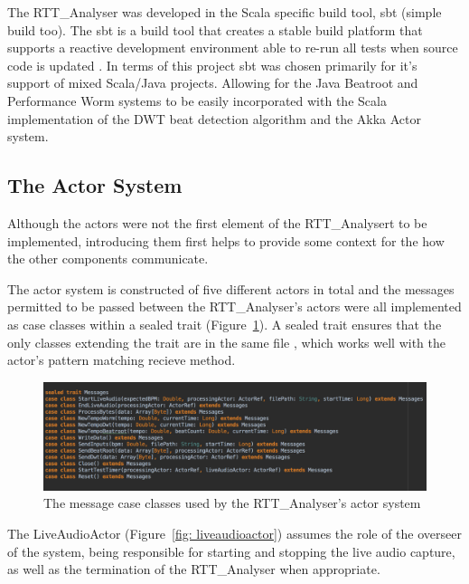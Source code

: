 \documentclass[a4paper, 11pt]{article}
\begin{document}
The RTT\_Analyser was developed in the Scala specific build tool, sbt (simple build too). The sbt is a build tool that creates a stable build platform that supports a reactive development environment able to re-run all tests when source code is updated \cite{sbt}. In terms of this project sbt was chosen primarily for it's support of mixed Scala/Java projects. Allowing for the Java Beatroot and Performance Worm systems to be easily incorporated with the Scala implementation of the DWT beat detection algorithm and the Akka Actor system.

\subsection{The Actor System}
Although the actors were not the first element of the RTT\_Analysert to be implemented, introducing them first helps to provide some context for the how the other components communicate.\par

The actor system is constructed of five different actors in total and the messages permitted to be passed between the RTT\_Analyser's actors were all implemented as case classes within a sealed trait (Figure~\ref{fig: messages}). A sealed trait ensures that the only classes extending the trait are in the same file \cite{odesky}, which works well with the actor's pattern matching recieve method.\par

\begin{figure}[htbp]
\centering
\includegraphics[scale=0.25]{images/messages.jpg}
\caption{The message case classes used by the RTT\_Analyser's actor system}
\label{fig: messages}
\end{figure} 

The LiveAudioActor (Figure~\ref{fig: liveaudioactor}) assumes the role of the overseer  of the system, being responsible for starting and stopping the live audio capture, as well as the termination of the RTT\_Analyser when appropriate. \par
\end{document}
